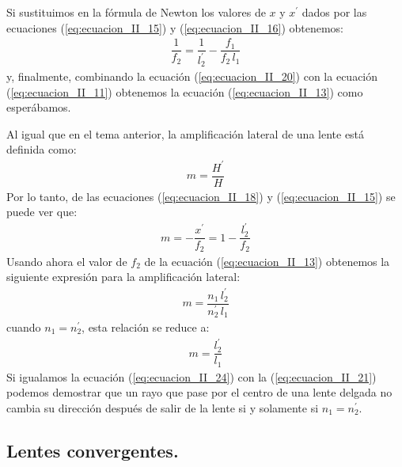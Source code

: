 \documentclass[14pt]{extarticle}
\begin{document}
Si sustituimos en la fórmula de Newton los valores de $x$ y $x^{\prime}$ dados por las ecuaciones
(\ref{eq:ecuacion_II_15}) y (\ref{eq:ecuacion_II_16}) obtenemos:
\begin{align}
\dfrac{1}{f_{2}} = \dfrac{1}{l_{2}^{\prime}} - \dfrac{f_{1}}{f_{2} \, l_{1}}
\label{eq:ecuacion_II_20}
\end{align}
y, finalmente, combinando la ecuación (\ref{eq:ecuacion_II_20}) con la ecuación (\ref{eq:ecuacion_II_11}) obtenemos la ecuación (\ref{eq:ecuacion_II_13}) como esperábamos.

Al igual que en el tema anterior, la amplificación lateral de una lente está definida como:
\begin{align}
m = \dfrac{H^{\prime}}{H}
\label{eq:ecuacion_II_21}
\end{align}
Por lo tanto, de las ecuaciones (\ref{eq:ecuacion_II_18}) y (\ref{eq:ecuacion_II_15}) se puede ver que:
\begin{align}
m = - \dfrac{x^{\prime}}{f_{2}} = 1 - \dfrac{l_{2}^{\prime}}{f_{2}}
\label{eq:ecuacion_II_22}
\end{align}
Usando ahora el valor de $f_{2}$ de la ecuación (\ref{eq:ecuacion_II_13}) obtenemos la siguiente expresión para la amplificación lateral:
\begin{align}
m = \dfrac{n_{1} \, l_{2}^{\prime}}{n_{2}^{\prime} \, l_{1}}
\label{eq:ecuacion_II_23}
\end{align}
cuando $n_{1} = n_{2}^{\prime}$, esta relación se reduce a:
\begin{align}
m = \dfrac{l_{2}^{\prime}}{l_{1}}
\label{eq:ecuacion_II_24}
\end{align}
Si igualamos la ecuación (\ref{eq:ecuacion_II_24}) con la (\ref{eq:ecuacion_II_21}) podemos demostrar que un rayo que pase por el centro de una lente delgada no cambia su dirección después de salir de la lente si y solamente si $n_{1} = n_{2}^{\prime}$.

\subsection{Lentes convergentes.}
\end{document}
